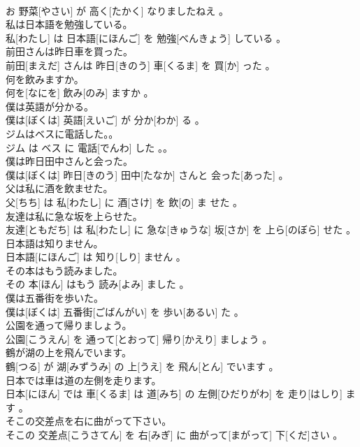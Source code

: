 \documentclass[8pt]{extreport}
\begin{document}
\begin{CJK}{UTF8}{min}
\\	お 野菜[やさい] が 高く[たかく] なりましたねえ 。
\\	私は日本語を勉強している。	
\\	私[わたし] は 日本語[にほんご] を 勉強[べんきょう] している 。
\\	前田さんは昨日車を買った。	
\\	前田[まえだ] さんは 昨日[きのう] 車[くるま] を 買[か] った 。
\\	何を飲みますか。	
\\	何を[なにを] 飲み[のみ] ますか 。
\\	僕は英語が分かる。	
\\	僕は[ぼくは] 英語[えいご] が 分か[わか] る 。
\\	ジムはベスに電話した。。	
\\	ジム は ベス に 電話[でんわ] した 。。
\\	僕は昨日田中さんと会った。	
\\	僕は[ぼくは] 昨日[きのう] 田中[たなか] さんと 会った[あった] 。
\\	父は私に酒を飲ませた。	
\\	父[ちち] は 私[わたし] に 酒[さけ] を 飲[の] ま せた 。
\\	友達は私に急な坂を上らせた。	
\\	友達[ともだち] は 私[わたし] に 急な[きゅうな] 坂[さか] を 上ら[のぼら] せた 。
\\	日本語は知りません。	
\\	日本語[にほんご] は 知り[しり] ません 。
\\	その本はもう読みました。	
\\	その 本[ほん] はもう 読み[よみ] ました 。
\\	僕は五番街を歩いた。	
\\	僕は[ぼくは] 五番街[ごばんがい] を 歩い[あるい] た 。
\\	公園を通って帰りましょう。	
\\	公園[こうえん] を 通って[とおって] 帰り[かえり] ましょう 。
\\	鶴が湖の上を飛んでいます。	
\\	鶴[つる] が 湖[みずうみ] の 上[うえ] を 飛ん[とん] でいます 。
\\	日本では車は道の左側を走ります。	
\\	日本[にほん] では 車[くるま] は 道[みち] の 左側[ひだりがわ] を 走り[はしり] ます 。
\\	そこの交差点を右に曲がって下さい。	
\\	そこの 交差点[こうさてん] を 右[みぎ] に 曲がって[まがって] 下[くだ]さい 。

\end{CJK}
\end{document}

